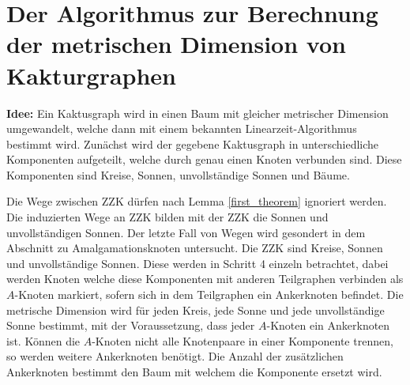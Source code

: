 \section{Der Algorithmus zur Berechnung der metrischen Dimension von Kakturgraphen}
\textbf{Idee:} Ein Kaktusgraph wird in einen Baum mit gleicher metrischer Dimension umgewandelt, welche dann mit einem bekannten Linearzeit-Algorithmus bestimmt wird.\newline\newline
Zunächst wird der gegebene Kaktusgraph in unterschiedliche Komponenten aufgeteilt, welche durch genau einen Knoten verbunden sind. Diese Komponenten sind Kreise, Sonnen, unvollständige Sonnen und Bäume.\newline\newline

Die Wege zwischen ZZK dürfen nach Lemma \ref{first_theorem} ignoriert werden. Die induzierten Wege an ZZK bilden mit der ZZK die Sonnen und unvollständigen Sonnen. Der letzte Fall von Wegen wird gesondert in dem Abschnitt zu Amalgamationsknoten untersucht.\newline\newline
Die ZZK sind Kreise, Sonnen und unvollständige Sonnen. Diese werden in Schritt 4 einzeln betrachtet, dabei werden Knoten welche diese Komponenten mit anderen Teilgraphen verbinden als $A$-Knoten markiert, sofern sich in dem Teilgraphen ein Ankerknoten befindet. Die metrische Dimension wird für jeden Kreis, jede Sonne und jede unvollständige Sonne bestimmt, mit der Voraussetzung, dass jeder $A$-Knoten ein Ankerknoten ist.\newline
Können die $A$-Knoten nicht alle Knotenpaare in einer Komponente trennen, so werden weitere Ankerknoten benötigt. Die Anzahl der zusätzlichen Ankerknoten bestimmt den Baum mit welchem die Komponente ersetzt wird. \newline\newline

